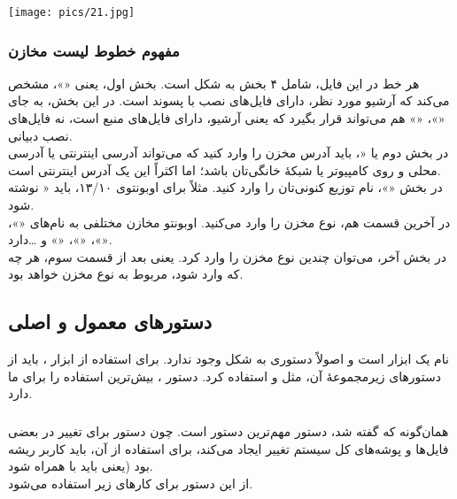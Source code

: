 \begin{center}
\texttt{[image: pics/21.jpg]}
\end{center}

\subsubsection{مفهوم خطوط لیست مخازن}
هر خط در این فایل، شامل ۴ بخش به شکل  است. بخش اول، یعنی «»، مشخص می‌کند که آرشیو مورد نظر، دارای فایل‌های نصب با پسوند  است. در این بخش، به جای «»، «» هم می‌تواند قرار بگیرد که یعنی آرشیو، دارای فایل‌های منبع است، نه فایل‌های نصب دبیانی.\\
در بخش دوم یا «، باید آدرس مخزن را وارد کنید که می‌تواند آدرسی اینترنتی یا آدرسی محلی و روی کامپیوتر یا شبکهٔ خانگی‌تان باشد؛ اما اکثراً این یک آدرس اینترنتی است.\\
در بخش «»، نام توزیع کنونی‌تان را وارد کنید. مثلاً برای اوبونتوی ۱۳/۱۰، باید « نوشته شود.\\
در آخرین قسمت هم، نوع مخزن را وارد می‌کنید. اوبونتو مخازن مختلفی به نام‌های «»، «»، «»، «» و \ldots دارد.\\
در بخش آخر، می‌توان چندین نوع مخزن را وارد کرد. یعنی بعد از قسمت سوم، هر چه که وارد شود، مربوط به نوع مخزن خواهد بود.

\subsection[دستورهای معمول و اصلی Apt]{دستورهای معمول و اصلی }
 نام یک ابزار است و اصولاً دستوری به شکل  وجود ندارد. برای استفاده از ابزار ، باید از دستورهای زیرمجموعهٔ آن، مثل  و  استفاده کرد. دستور ، بیش‌ترین استفاده را برای ما دارد.

\subsubsection[apt-get]{}
همان‌گونه که گفته شد، دستور  مهم‌ترین دستور است. چون دستور برای تغییر در بعضی فایل‌ها و پوشه‌های کل سیستم تغییر ایجاد می‌کند، برای استفاده از آن، باید کاربر ریشه بود (یعنی باید با  همراه شود.\\
از این دستور برای کارهای زیر استفاده می‌شود.

